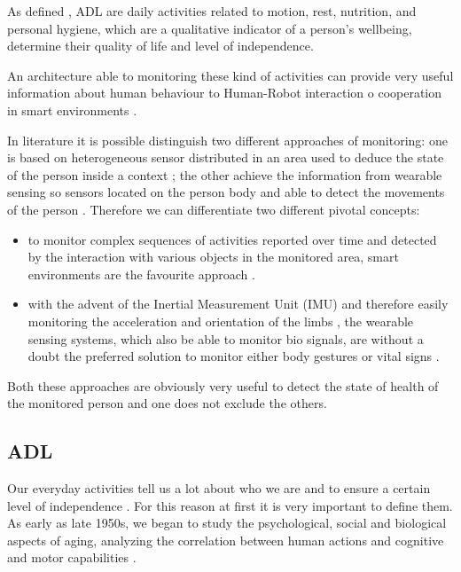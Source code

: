 \documentclass{thesisreport}
\begin{document}
 As defined \cite{buoncompagni2017towards}, ADL are daily activities related to motion, rest, nutrition, and personal hygiene, which are a qualitative indicator of a person’s wellbeing, determine their quality of life and level of independence. 
 
 An architecture able to monitoring these kind of activities can provide very useful information about human behaviour to Human-Robot interaction o cooperation in smart environments \cite{bruno2014public}.  
 
 In literature it is possible distinguish two different approaches of monitoring: one is based on heterogeneous sensor distributed in an area used to deduce the state of the person inside a context \cite{aggarwal2011human}; the other achieve the information from wearable sensing so sensors located on the person body and able to detect the movements of the person \cite{bao2004activity}. 
 Therefore we can differentiate two different pivotal concepts:
 \begin{itemize}
    \item to monitor complex sequences of activities reported over time and detected by the interaction with various objects in the monitored area, smart environments are the favourite approach \cite{scalmato2012describing}.
    \item with the advent of the Inertial Measurement Unit (IMU) and therefore easily monitoring the acceleration and orientation of the limbs , the wearable sensing systems, which also be able to monitor bio signals, are without a doubt the preferred solution to monitor either body gestures or vital signs \cite{bruno2013analysis}.
\end{itemize}
 
Both these approaches are obviously very useful to detect the state of health of the monitored person and one does not exclude the others. 

\subsection*{ADL}
Our everyday activities tell us a lot about who we are and to ensure a certain level of independence \cite{buoncompagni2017towards}. For this reason at first it is very important to define them. 
\\
As early as late 1950s, we began to study the psychological, social and biological aspects of aging, analyzing the correlation between human actions and cognitive and motor capabilities \cite{buoncompagni2017towards}. 
\\
\end{document}
